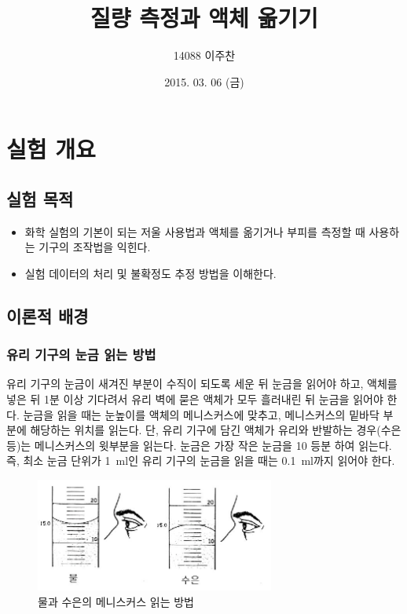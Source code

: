 \documentclass{GSHS-chemexp}
\begin{document}
	
	\title{질량 측정과 액체 옮기기}	
	\date{2015. 03. 06 (금)}
	\author{14088 이주찬}
	\maketitle
	
	\section{실험 개요}
	
	\subsection{실험 목적}
	
	\begin{itemize}
		\item 화학 실험의 기본이 되는 저울 사용법과 액체를 옮기거나
		부피를 측정할 때 사용하는 기구의 조작법을 익힌다.
		\item 실험 데이터의 처리 및 불확정도 추정 방법을 이해한다.
	\end{itemize}
	
	\subsection{이론적 배경}
	
	\subsubsection{유리 기구의 눈금 읽는 방법}
	유리 기구의 눈금이 새겨진 부분이 수직이 되도록 세운 뒤
	눈금을 읽어야 하고, 액체를 넣은 뒤 \unit{1}{분} 이상 기다려서
	유리 벽에 묻은 액체가 모두 흘러내린 뒤 눈금을 읽어야 한다.
	눈금을 읽을 때는 눈높이를 액체의 메니스커스에 맞추고,
	메니스커스의 밑바닥 부분에 해당하는 위치를 읽는다.
	단, 유리 기구에 담긴 액체가 유리와 반발하는 경우(수은 등)는
	메니스커스의 윗부분을 읽는다.
	눈금은 가장 작은 눈금을 10 등분 하여 읽는다.
	즉, 최소 눈금 단위가 \SI{1}{\milli\litre}인 유리 기구의
	눈금을 읽을 때는 \SI{0.1}{\milli\litre}까지 읽어야 한다.
	\begin{figure}[H]
		\centering
		\includegraphics[width=0.7\textwidth]{Meniscus.png}
		\caption{물과 수은의 메니스커스 읽는 방법}
		\label{fig:meniscus}
	\end{figure}
	
\end{document}
